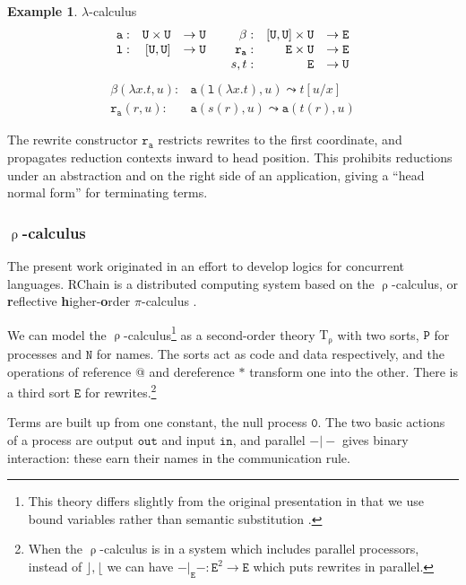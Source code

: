 \documentclass[conference]{IEEEtran}
\theoremstyle{definition}
\newtheorem{example}[theorem]{Example}
\newcommand{\mrm}[1]{\mathrm{#1}}
\newcommand{\mtt}[1]{\mathtt{#1}}
\newcommand{\T}{\mrm{T}}
\newcommand{\ttu}{\mtt{U}}
\newcommand{\N}{\mtt{N}}
\newcommand{\PP}{\mtt{P}}
\newcommand{\tto}{\mtt{out}}
\newcommand{\tti}{\mtt{in}}
\newcommand{\ttz}{\mtt{0}}
\begin{document}
\begin{example} $\lambda$-calculus
\[\begin{array}{rrl@{\quad\quad}rrl}
    \mtt{a}: &\ttu \times \ttu & \to \ttu & \beta: &[\ttu,\ttu] \times \ttu &\to \mtt{E} \\
    \mtt{l}: &[\ttu,\ttu] &\to \ttu &
    \mtt{r}_{\mtt{a}}: &\mtt{E} \times \ttu & \to \mtt{E}\\
    &&& s,t:&\mtt{E} &\to \ttu
\end{array}\]
\[\begin{array}{rl}
    \beta(\lambda x.t, u): & \mtt{a}(\mtt{l}(\lambda x.t), u) \leadsto t[u/x]\\
    \mtt{r}_{\mtt{a}}(r, u): & \mtt{a}(s(r), u) \leadsto \mtt{a}(t(r), u)
\end{array}\]

The rewrite constructor $\mtt{r}_{\mtt{a}}$ restricts rewrites to the first coordinate, and propagates reduction contexts inward to head position.  This prohibits reductions under an abstraction and on the right side of an application, giving a ``head normal form'' for terminating terms.
\end{example}

\subsubsection{$\uprho$-calculus}
\label{ssec:rho}

The present work originated in an effort to develop logics for concurrent languages. RChain \cite{rchain} is a distributed computing system based on the  $\uprho$-calculus, or \textbf{r}eflective \textbf{h}igher-\textbf{o}rder $\pi$-calculus \cite{rhocal}.

We can model the $\uprho$-calculus\footnote{This theory differs slightly from the original presentation in that we use bound variables rather than semantic substitution \cite[section 2.7]{rhocal}.} as a second-order theory $\T_\uprho$ with two sorts, $\PP$ for processes and $\N$ for names. The sorts act as code and data respectively, and the operations of reference @ and dereference $\ast$ transform one into the other. There is a third sort $\mtt{E}$ for rewrites.\footnote{When the $\uprho$-calculus is in a system which includes parallel processors, instead of $\rfloor,\lfloor$ we can have $-\vert_\mtt{E}-:\mtt{E}^2\to \mtt{E}$ which puts rewrites in parallel.}

Terms are built up from one constant, the null process $\ttz$. The two basic actions of a process are output $\tto$ and input $\tti$, and parallel $-\vert-$ gives binary interaction: these earn their names in the communication rule.  
\end{document}
